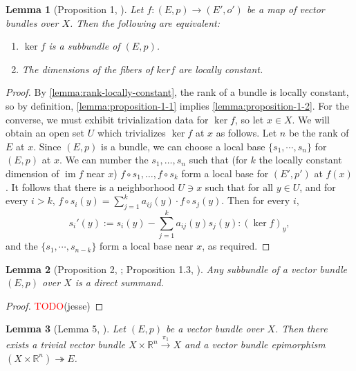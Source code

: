 \documentclass[11pt]{article}
\newcommand{\R}{\mathbb{R}}
\newcommand{\remph}[1]{\textcolor{red}{#1}}
\newcommand{\TODO}{\remph{TODO}}
\newcommand{\im}{\operatorname{im}}
\renewcommand{\ker}{\operatorname{ker}}
\theoremstyle{plain}
\newtheorem{lemma}{Lemma}[section]
\theoremstyle{definition}
\begin{document}
\begin{lemma}[Proposition 1, \cite{swan1962vector}]\label{lemma:proposition-1}
  Let \(f : (E,p) \to (E',o')\) be a map of vector bundles over \(X\). Then the following are equivalent:
  \begin{enumerate}[label={(\alph*)}]
  \item \label{lemma:proposition-1-1} \(\ker f\) is a subbundle of \((E,p)\). 
  \item \label{lemma:proposition-1-2} The dimensions of the fibers of \(ker f\) are locally constant.
  \end{enumerate}
\end{lemma}
\begin{proof}
  By \ref{lemma:rank-locally-constant}, the rank of a bundle is locally constant, so by definition, \ref{lemma:proposition-1-1} implies \ref{lemma:proposition-1-2}. For the converse, we must exhibit trivialization data for \(\ker f\), so let \(x \in X\). We will obtain an open set \(U\) which trivializes \(\ker f\) at \(x\) as follows. Let \(n\) be the rank of \(E\) at \(x\). Since \((E,p)\) is a bundle, we can choose a local base \(\{s_1, \cdots, s_n\}\) for \((E,p)\) at \(x\). We can number the \(s_1, \dots, s_n\) such that (for \(k\) the locally constant dimension of \(\im f\) near \(x\)) \(f \circ s_1, \dots, f \circ s_k\) form a local base for \((E',p')\) at \(f(x)\). It follows that there is a neighborhood \(U \ni x\) such that for all \(y \in U\), and for every \(i > k\), \(f \circ s_i(y) = \sum_{j = 1}^k a_{ij}(y) \cdot f \circ s_j(y).\) Then for every \(i\),
  \[s_i'(y) := s_i(y) - \sum_{j = 1}^k a_{ij}(y)s_j(y) : (\ker f)_y,\]
  and the $\{s_1, \cdots, s_{n - k}\}$ form a local base near \(x\), as required.
\end{proof}
\begin{lemma}[Proposition 2, \cite{swan1962vector}; Proposition 1.3, \cite{hatcher2003vector}] \label{lemma:proposition-2}
  Any subbundle of a vector bundle \((E,p)\) over \(X\) is a direct summand.
\end{lemma}

\begin{proof}
  \TODO(jesse)
\end{proof}


\begin{lemma}[Lemma 5, \cite{swan1962vector}]\label{lemma:lemma:5}
  Let \((E,p)\) be a vector bundle over \(X\). Then there exists a trivial vector bundle \(X \times \R^n \overset{\pi_1}{\to} X\) and a vector bundle epimorphism \((X \times \R^n) \twoheadrightarrow E\).
\end{lemma}
\end{document}
